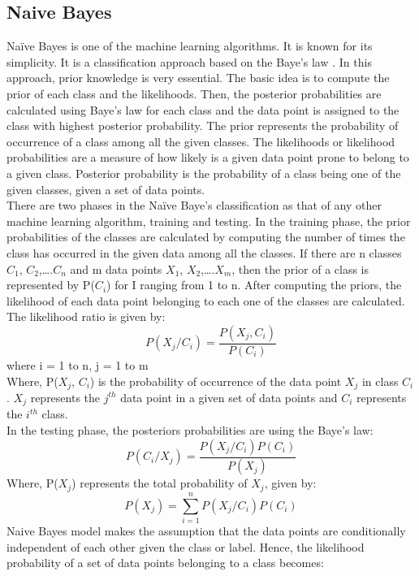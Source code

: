 \documentclass[sigconf]{acmart}
\begin{document}
\subsection{Naive Bayes}
Naïve Bayes is one of the machine learning algorithms. It is known for its simplicity. It is a classification approach based on the Baye’s law . In this approach, prior knowledge is very essential. The basic idea is to compute the prior of each class and the likelihoods. Then, the posterior probabilities are calculated using Baye’s law for each class and the data point is assigned to the class with highest posterior probability. The prior represents the probability of occurrence of a class among all the given classes. The likelihoods or likelihood probabilities are a measure of how likely is a given data point prone to belong to a given class. Posterior probability is the probability of a class being one of the given classes, given a set of data points. \\
There are two phases in the Naïve Baye’s classification as that of any other machine learning algorithm, training and testing.  In the training phase, the prior probabilities of the classes are calculated by computing the number of times the class has occurred in the given data among all the classes. If there are n classes $C_1$, $C_2$,….$C_n$ and m data points $X_1$, $X_2$,….$X_m$, then the prior of a class is represented by P($C_i$) for I ranging from 1 to n. After computing the priors, the likelihood of each data point belonging to each one of the classes are calculated. The likelihood ratio is given by:
\begin{equation}
    P(X_j/C_i) = \frac{P(X_j, C_i)}{P(C_i)}
\end{equation}
where i = 1 to n, j = 1 to m\\
Where, P($X_j$, $C_i$) is the probability of occurrence of the data point $X_j$ in class $C_i$. $X_j$ represents the $j^{th}$ data point in a given set of data points and $C_i$ represents the $i^{th}$ class.\\
In the testing phase, the posteriors probabilities are using the Baye’s law:
\begin{equation}
    P(C_i/X_j) = \frac{P(X_j/ C_i) P(C_i)}{P(X_j) }	
\end{equation}
Where, P($X_j$) represents the total probability of $X_j$, given by:
\begin{equation}
    P(X_j) = \sum_{i=1}^{n}P(X_j/ C_i)P(C_i)
\end{equation}
Naive Bayes model makes the assumption that the data points are conditionally independent of each other given the class or label. Hence, the likelihood probability of a set of data points belonging to a class becomes:
\end{document}
